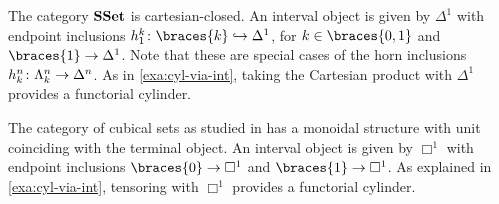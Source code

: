 \documentclass[reqno,10pt,a4paper,oneside,draft]{amsart}
\begin{document}
\begin{example} \label{exa:cyl-in-sset}
The category $\mathbf{SSet}$ is cartesian-closed.
An interval object is given by $\Delta^1$ with endpoint inclusions $h^k_1 \co \braces{ k } \hookrightarrow \Delta^1$, for $k \in \braces{ 0, 1 }$ and $\braces{1} \to \Delta^1$.
Note that these are special cases of the horn inclusions $h_k^n \colon \Lambda_k^n \to \Delta^n$.
As in \cref{exa:cyl-via-int}, taking the Cartesian product with $\Delta^1$ provides a functorial cylinder.
\begin{comment}
The category $\SSet$ can be equipped with a functorial cylinder, given by the endofunctor $\Delta_1 \times (-) \co \SSet \to \SSet$.
For $k \in \braces{0, 1}$, the endpoint inclusion $\kcyl \co \id_\SSet \to \Delta_1 \times (-)$ is given by the natural transformation with components
\[
  (h^k_1, \id_X) \co A \to \Delta_1 \times A
\]
where the maps $h^0_1 \, , h^1_1 \co 1 \to \Delta_1$ are the two endpoint inclusions.
Note that these are special cases of the horn inclusions $h^k_n \co \Lambda^k_n \to \Delta_n$.
\end{comment}
\end{example}

\begin{example} \label{exa:cyl-in-cuset}
The category of cubical sets  as studied in  has a monoidal structure with unit coinciding with the terminal object.
An interval object is given by $\Box^1$  with endpoint inclusions $\braces{0} \to \Box^1$ and $\braces{1} \to \Box^1$.
As explained in \cref{exa:cyl-via-int}, tensoring with $\Box^1$ provides a functorial cylinder.
\end{example}

\medskip
\end{document}
